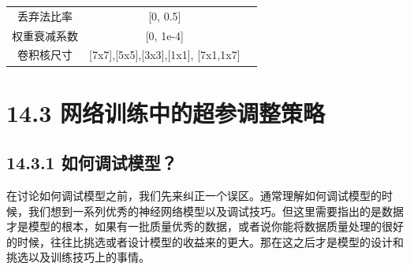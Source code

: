 \begin{longtable}[]{@{}ccc@{}}
\begin{minipage}[t]{0.12\columnwidth}\centering\strut
丢弃法比率\strut
\end{minipage} & \begin{minipage}[t]{0.39\columnwidth}\centering\strut
{[}0, 0.5{]}\strut
\end{minipage} & \begin{minipage}[t]{0.39\columnwidth}\centering\strut
\strut
\end{minipage}\tabularnewline
\begin{minipage}[t]{0.12\columnwidth}\centering\strut
权重衰减系数\strut
\end{minipage} & \begin{minipage}[t]{0.39\columnwidth}\centering\strut
{[}0, 1e-4{]}\strut
\end{minipage} & \begin{minipage}[t]{0.39\columnwidth}\centering\strut
\strut
\end{minipage}\tabularnewline
\begin{minipage}[t]{0.12\columnwidth}\centering\strut
卷积核尺寸\strut
\end{minipage} & \begin{minipage}[t]{0.39\columnwidth}\centering\strut
{[}7x7{]},{[}5x5{]},{[}3x3{]},{[}1x1{]}, {[}7x1,1x7{]}\strut
\end{minipage} & \begin{minipage}[t]{0.39\columnwidth}\centering\strut
\strut
\end{minipage}\tabularnewline
\bottomrule
\end{longtable}

\section{14.3
网络训练中的超参调整策略}\label{ux7f51ux7edcux8badux7ec3ux4e2dux7684ux8d85ux53c2ux8c03ux6574ux7b56ux7565}

\subsection{14.3.1
如何调试模型？}\label{ux5982ux4f55ux8c03ux8bd5ux6a21ux578b}

在讨论如何调试模型之前，我们先来纠正一个误区。通常理解如何调试模型的时候，我们想到一系列优秀的神经网络模型以及调试技巧。但这里需要指出的是数据才是模型的根本，如果有一批质量优秀的数据，或者说你能将数据质量处理的很好的时候，往往比挑选或者设计模型的收益来的更大。那在这之后才是模型的设计和挑选以及训练技巧上的事情。

